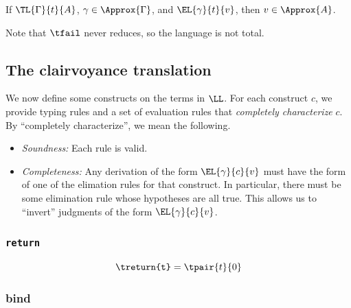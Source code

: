 \begin{lemma}
  If \( \TL{\Gamma}{t}{A} \), \( \gamma \in \Approx{\Gamma} \), and \( \EL{\gamma}{t}{v} \), then \( v \in \Approx{A} \).
\end{lemma}

Note that \( \tfail \) never reduces, so the language is not total.

\subsection{The clairvoyance translation}

We now define some constructs on the terms in \( \LL \).  For each construct \( c \), we provide typing rules and a set of evaluation rules that \emph{completely characterize} \( c \).  By ``completely characterize'', we mean the following.

\begin{itemize}
\item \emph{Soundness:} Each rule is valid.
\item \emph{Completeness:} Any derivation of the form \( \EL{\gamma}{c}{v} \) must have the form of one of the elimation rules for that construct.  In particular, there must be some elimination rule whose hypotheses are all true.  This allows us to ``invert'' judgments of the form \( \EL{\gamma}{c}{v} \).
\end{itemize}

\subsubsection{\texttt{return}}

\[
  \texttt{\treturn{t}} = \tpair{t}{0}
\]

\begin{center}
  \begin{prooftree}
  \end{prooftree}
\end{center}

\begin{center}
  \begin{prooftree}
  \end{prooftree}
\end{center}

\subsubsection{bind}

